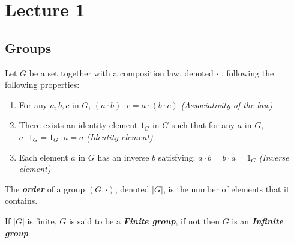
\section{Lecture 1}

\subsection{Groups}
\begin{boxedDefinition}[Group]\label{def:group-def}
    
Let $G$ be a set together with a composition law, denoted $\cdot$ , following the following properties:
\begin{enumerate}
\item\label{def:group-def-associativity} For any $a, b, c$ in $G$, $(a \cdot b) \cdot c = a \cdot (b \cdot c)$ \textit{(Associativity of the law)}
\item\label{def:group-def-neutral-element} There exists an identity element $1_G$ in $G$ such that for any $a$ in $G$, $a\cdot 1_G = 1_G\cdot a = a$ \textit{(Identity element)}
\item \label{def:group-def-inverse} Each element $a$ in $G$ has an inverse $b$ satisfying: $a \cdot b = b \cdot a = 1_G$ \textit{(Inverse element)}
\end{enumerate} 
\end{boxedDefinition}

\begin{boxedDefinition}[Order]\label{def:group-order}
    The \textit{\textbf{order}} of a group $(G, \cdot)$, denoted $|G|$, is the number of elements that it contains.
\end{boxedDefinition}
 If $|G|$ is finite, $G$ is said to be a \textit{\textbf{Finite group}}, if not then $G$ is an \textit{\textbf{Infinite group}}


